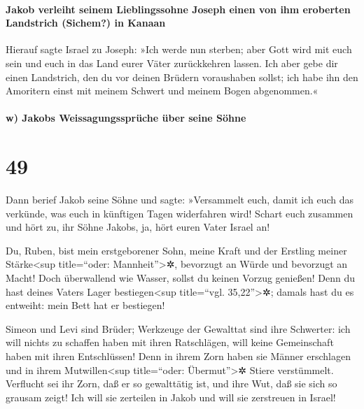 \hypertarget{jakob-verleiht-seinem-lieblingssohne-joseph-einen-von-ihm-eroberten-landstrich-sichem-in-kanaan}{%
\paragraph{Jakob verleiht seinem Lieblingssohne Joseph einen von ihm
eroberten Landstrich (Sichem?) in
Kanaan}\label{jakob-verleiht-seinem-lieblingssohne-joseph-einen-von-ihm-eroberten-landstrich-sichem-in-kanaan}}

 Hierauf sagte Israel zu Joseph: »Ich werde nun sterben;
aber Gott wird mit euch sein und euch in das Land eurer Väter
zurückkehren lassen.  Ich aber gebe dir einen Landstrich,
den du vor deinen Brüdern voraushaben sollst; ich habe ihn den Amoritern
einst mit meinem Schwert und meinem Bogen abgenommen.«

\hypertarget{w-jakobs-weissagungsspruxfcche-uxfcber-seine-suxf6hne}{%
\paragraph{w) Jakobs Weissagungssprüche über seine
Söhne}\label{w-jakobs-weissagungsspruxfcche-uxfcber-seine-suxf6hne}}

\hypertarget{section-48}{%
\section{49}\label{section-48}}

 Dann berief Jakob seine Söhne und sagte: »Versammelt
euch, damit ich euch das verkünde, was euch in künftigen Tagen
widerfahren wird!  Schart euch zusammen und hört zu, ihr
Söhne Jakobs, ja, hört euren Vater Israel an!

 Du, Ruben, bist mein erstgeborener Sohn, meine Kraft und
der Erstling meiner Stärke\textless sup title=``oder:
Mannheit''\textgreater✲, bevorzugt an Würde und bevorzugt an Macht!
 Doch überwallend wie Wasser, sollst du keinen Vorzug
genießen! Denn du hast deines Vaters Lager bestiegen\textless sup
title=``vgl. 35,22''\textgreater✲; damals hast du es entweiht: mein Bett
hat er bestiegen!

 Simeon und Levi sind Brüder; Werkzeuge der Gewalttat sind
ihre Schwerter:  ich will nichts zu schaffen haben mit
ihren Ratschlägen, will keine Gemeinschaft haben mit ihren Entschlüssen!
Denn in ihrem Zorn haben sie Männer erschlagen und in ihrem
Mutwillen\textless sup title=``oder: Übermut''\textgreater✲ Stiere
verstümmelt.  Verflucht sei ihr Zorn, daß er so
gewalttätig ist, und ihre Wut, daß sie sich so grausam zeigt! Ich will
sie zerteilen in Jakob und will sie zerstreuen in Israel!

